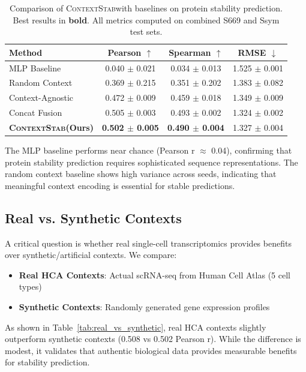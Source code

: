 \documentclass{article}
\newcommand{\contextstab}{\textsc{ContextStab}}
\begin{document}
\begin{table}[t]
\caption{Comparison of \contextstab with baselines on protein stability prediction. Best results in \textbf{bold}. All metrics computed on combined S669 and Ssym test sets.}
\label{tab:main}
\centering
\begin{tabular}{lccc}
\toprule
Method & Pearson $\uparrow$ & Spearman $\uparrow$ & RMSE $\downarrow$ \\
\midrule
MLP Baseline & 0.040 $\pm$ 0.021 & 0.034 $\pm$ 0.013 & 1.525 $\pm$ 0.001 \\
Random Context & 0.369 $\pm$ 0.215 & 0.351 $\pm$ 0.202 & 1.383 $\pm$ 0.082 \\
Context-Agnostic & 0.472 $\pm$ 0.009 & 0.459 $\pm$ 0.018 & 1.349 $\pm$ 0.009 \\
Concat Fusion & 0.505 $\pm$ 0.003 & 0.493 $\pm$ 0.002 & 1.324 $\pm$ 0.002 \\
\textbf{\contextstab (Ours)} & \textbf{0.502 $\pm$ 0.005} & \textbf{0.490 $\pm$ 0.004} & 1.327 $\pm$ 0.004 \\
\bottomrule
\end{tabular}
\end{table}

The MLP baseline performs near chance (Pearson r $\approx$ 0.04), confirming that protein stability prediction requires sophisticated sequence representations. The random context baseline shows high variance across seeds, indicating that meaningful context encoding is essential for stable predictions.

\subsection{Real vs. Synthetic Contexts}

A critical question is whether real single-cell transcriptomics provides benefits over synthetic/artificial contexts. We compare:
\begin{itemize}
    \item \textbf{Real HCA Contexts}: Actual scRNA-seq from Human Cell Atlas (5 cell types)
    \item \textbf{Synthetic Contexts}: Randomly generated gene expression profiles
\end{itemize}

As shown in Table~\ref{tab:real_vs_synthetic}, real HCA contexts slightly outperform synthetic contexts (0.508 vs 0.502 Pearson r). While the difference is modest, it validates that authentic biological data provides measurable benefits for stability prediction.
\end{document}
